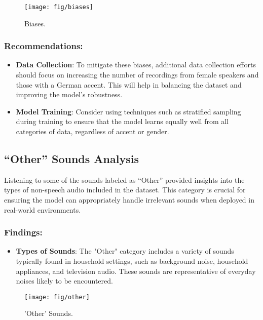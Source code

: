 \begin{figure}[!ht]
	\centering
	\texttt{[image: fig/biases]}
	\vspace{-0.3cm}
	\caption{Biases.}
	\label{fig:Biases}
	\vspace{-0.1cm}
\end{figure}


\subsubsection{Recommendations:}

\begin{itemize}
    \item \textbf{Data Collection}: To mitigate these biases, additional data collection efforts should focus on increasing the number of recordings from female speakers and those with a German accent. This will help in balancing the dataset and improving the model's robustness.
    \item \textbf{Model Training}: Consider using techniques such as stratified sampling during training to ensure that the model learns equally well from all categories of data, regardless of accent or gender.
\end{itemize}

\subsection{``Other'' Sounds Analysis}

Listening to some of the sounds labeled as “Other” provided insights into the types of non-speech audio included in the dataset. This category is crucial for ensuring the model can appropriately handle irrelevant sounds when deployed in real-world environments.

\subsubsection{Findings:}

\begin{itemize}
    \item \textbf{Types of Sounds}: The "Other" category includes a variety of sounds typically found in household settings, such as background noise, household appliances, and television audio. These sounds are representative of everyday noises likely to be encountered.
\end{itemize}

\begin{figure}[!ht]
	\centering
	\texttt{[image: fig/other]}
	\vspace{-0.3cm}
	\caption{'Other' Sounds.}
	\label{fig:Other}
	\vspace{-0.1cm}
\end{figure}

